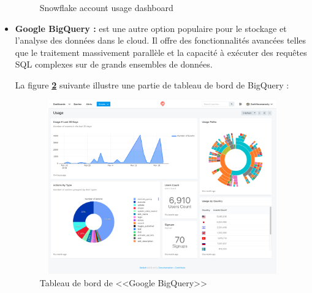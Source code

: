 \begin{itemize}
\begin{figure}[H]
            \caption{Snowflake account usage dashboard}
            \label{fig:info}
            \end{figure}
    \item\textbf{Google BigQuery :} est une autre option populaire pour le stockage et l'analyse des données dans le cloud. 
    Il offre des fonctionnalités avancées telles que le traitement massivement parallèle et la capacité à exécuter des requêtes SQL complexes sur de grands ensembles de données. 
    \par La figure \textbf{\ref{fig:BQ}} suivante illustre une partie de tableau de bord de BigQuery :
            \begin{figure}[H]
            \centering
            \includegraphics[width =13cm, height=7.5cm]{img/captures/bigquery}
            \caption{Tableau de bord de <<Google BigQuery>>}
            \label{fig:BQ}
            \end{figure}


\end{itemize}
